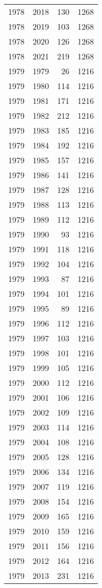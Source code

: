 \documentclass[
  10pt,
  letterpaper,
  DIV=11,
  numbers=noendperiod,
  twoside]{scrartcl}
\begin{document}
\begin{longtable}[]{@{}rrrr@{}}
1978 & 2018 & 130 & 1268 \\
1978 & 2019 & 103 & 1268 \\
1978 & 2020 & 126 & 1268 \\
1978 & 2021 & 219 & 1268 \\
1979 & 1979 & 26 & 1216 \\
1979 & 1980 & 114 & 1216 \\
1979 & 1981 & 171 & 1216 \\
1979 & 1982 & 212 & 1216 \\
1979 & 1983 & 185 & 1216 \\
1979 & 1984 & 192 & 1216 \\
1979 & 1985 & 157 & 1216 \\
1979 & 1986 & 141 & 1216 \\
1979 & 1987 & 128 & 1216 \\
1979 & 1988 & 113 & 1216 \\
1979 & 1989 & 112 & 1216 \\
1979 & 1990 & 93 & 1216 \\
1979 & 1991 & 118 & 1216 \\
1979 & 1992 & 104 & 1216 \\
1979 & 1993 & 87 & 1216 \\
1979 & 1994 & 101 & 1216 \\
1979 & 1995 & 89 & 1216 \\
1979 & 1996 & 112 & 1216 \\
1979 & 1997 & 103 & 1216 \\
1979 & 1998 & 101 & 1216 \\
1979 & 1999 & 105 & 1216 \\
1979 & 2000 & 112 & 1216 \\
1979 & 2001 & 106 & 1216 \\
1979 & 2002 & 109 & 1216 \\
1979 & 2003 & 114 & 1216 \\
1979 & 2004 & 108 & 1216 \\
1979 & 2005 & 128 & 1216 \\
1979 & 2006 & 134 & 1216 \\
1979 & 2007 & 119 & 1216 \\
1979 & 2008 & 154 & 1216 \\
1979 & 2009 & 165 & 1216 \\
1979 & 2010 & 159 & 1216 \\
1979 & 2011 & 156 & 1216 \\
1979 & 2012 & 164 & 1216 \\
1979 & 2013 & 231 & 1216 \\

\end{longtable}
\end{document}
